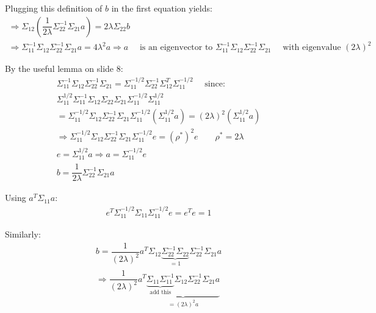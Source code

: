 \noindent Plugging this definition of $b$ in the first equation yields:
\begin{equation*}
  \begin{gathered}
    \Rightarrow \Sigma_{12}\left(\dfrac{1}{2\lambda}\Sigma_{22}^{-1}\Sigma_{21}a\right) = 2\lambda\Sigma_{22}b\\
    \Rightarrow \Sigma_{11}^{-1}\Sigma_{12}\Sigma_{22}^{-1}\Sigma_{21}a = 4\lambda^2a\Rightarrow a\quad\text{ is an eigenvector to } \Sigma_{11}^{-1}\Sigma_{12}\Sigma_{22}^{-1}\Sigma_{21}\quad\text{ with eigenvalue } (2\lambda)^2
  \end{gathered}
\end{equation*}\par
\noindent By the useful lemma on slide 8:
\begin{equation*}
  \begin{gathered}
    \Sigma_{11}^{-1}\Sigma_{12}\Sigma_{22}^{-1}\Sigma_{21} = \Sigma_{11}^{-1/2}\Sigma_{22}^{-1}\Sigma_{12}^T\Sigma_{11}^{-1/2}\quad\text{ since:}\\
    \Sigma_{11}^{1/2}\Sigma_{11}^{-1}\Sigma_{12}\Sigma_{22}\Sigma_{21}\Sigma_{11}^{-1/2}\Sigma_{11}^{1/2}\\
    = \Sigma_{11}^{-1/2}\Sigma_{12}\Sigma_{22}^{-1}\Sigma_{21}\Sigma_{11}^{-1/2}(\Sigma_{11}^{1/2}a) = (2\lambda)^2(\Sigma_{11}^{1/2}a)\\
    \Rightarrow \Sigma_{11}^{-1/2}\Sigma_{12}\Sigma_{22}^{-1}\Sigma_{21}\Sigma_{11}^{-1/2}e = (\rho^*)^2e\qquad \rho^* = 2\lambda\\
    e = \Sigma_{11}^{1/2}a \Rightarrow a= \Sigma_{11}^{-1/2}e\\
    b = \dfrac{1}{2\lambda}\Sigma_{22}^{-1}\Sigma_{21}a
  \end{gathered}
\end{equation*}\par
\noindent Using $a^T\Sigma_{11}a$:
\begin{equation*}
  \begin{gathered}
    e^T\Sigma^{-1/2}_{11}\Sigma_{11}\Sigma_{11}^{-1/2}e = e^Te=1
  \end{gathered}
\end{equation*}\par
\noindent Similarly:
\begin{equation*}
  \begin{gathered}
    b = \dfrac{1}{(2\lambda)^2}a^T\Sigma_{12}\underbrace{\Sigma_{22}^{-1}\Sigma_{22}}_{\text{$=1$}}\Sigma_{22}^{-1}\Sigma_{21}a\\
    \Rightarrow \dfrac{1}{(2\lambda)^2}a^T\underbrace{\underbrace{\Sigma_{11}\Sigma_{11}^{-1}}_{\text{add this}}\Sigma_{12}\Sigma_{22}^{-1}\Sigma_{21}a}_{= (2\lambda)^2a}
  \end{gathered}
\end{equation*}\par
